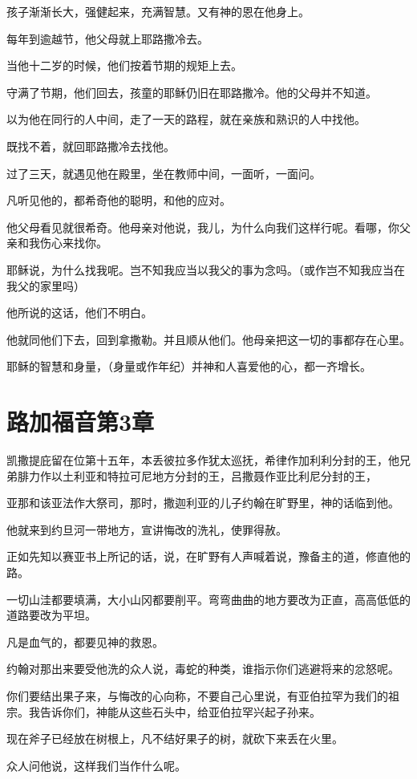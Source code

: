 \documentclass[12pt,oneside]{book}
\begin{document}
孩子渐渐长大，强健起来，充满智慧。又有神的恩在他身上。

每年到逾越节，他父母就上耶路撒冷去。

当他十二岁的时候，他们按着节期的规矩上去。

守满了节期，他们回去，孩童的耶稣仍旧在耶路撒冷。他的父母并不知道。

以为他在同行的人中间，走了一天的路程，就在亲族和熟识的人中找他。

既找不着，就回耶路撒冷去找他。

过了三天，就遇见他在殿里，坐在教师中间，一面听，一面问。

凡听见他的，都希奇他的聪明，和他的应对。

他父母看见就很希奇。他母亲对他说，我儿，为什么向我们这样行呢。看哪，你父亲和我伤心来找你。

耶稣说，为什么找我呢。岂不知我应当以我父的事为念吗。（或作岂不知我应当在我父的家里吗）

他所说的这话，他们不明白。

他就同他们下去，回到拿撒勒。并且顺从他们。他母亲把这一切的事都存在心里。

耶稣的智慧和身量，（身量或作年纪）并神和人喜爱他的心，都一齐增长。

\chapter{路加福音第3章}
凯撒提庇留在位第十五年，本丢彼拉多作犹太巡抚，希律作加利利分封的王，他兄弟腓力作以土利亚和特拉可尼地方分封的王，吕撒聂作亚比利尼分封的王，

亚那和该亚法作大祭司，那时，撒迦利亚的儿子约翰在旷野里，神的话临到他。

他就来到约旦河一带地方，宣讲悔改的洗礼，使罪得赦。

正如先知以赛亚书上所记的话，说，在旷野有人声喊着说，豫备主的道，修直他的路。

一切山洼都要填满，大小山冈都要削平。弯弯曲曲的地方要改为正直，高高低低的道路要改为平坦。

凡是血气的，都要见神的救恩。

约翰对那出来要受他洗的众人说，毒蛇的种类，谁指示你们逃避将来的忿怒呢。

你们要结出果子来，与悔改的心向称，不要自己心里说，有亚伯拉罕为我们的祖宗。我告诉你们，神能从这些石头中，给亚伯拉罕兴起子孙来。

现在斧子已经放在树根上，凡不结好果子的树，就砍下来丢在火里。

众人问他说，这样我们当作什么呢。
\end{document}
